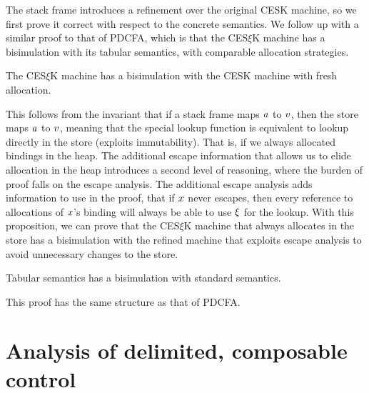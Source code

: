 The stack frame introduces a refinement over the original CESK machine, so we first prove it correct with respect to the concrete semantics.
%
We follow up with a similar proof to that of PDCFA, which is that the CES$\xi$K machine has a bisimulation with its tabular semantics, with comparable allocation strategies.
\begin{theorem}\label{thm:refinement}
  The CES$\xi$K machine has a bisimulation with the CESK machine with fresh allocation.
\end{theorem}
This follows from the invariant that if a stack frame maps $a$ to $v$, then the store maps $a$ to $v$, meaning that the special lookup function is equivalent to lookup directly in the store (exploits immutability).
%
That is, if we always allocated bindings in the heap.
%
The additional escape information that allows us to elide allocation in the heap introduces a second level of reasoning, where the burden of proof falls on the escape analysis.
%
The additional escape analysis adds information to use in the proof, that if $x$ never escapes, then every reference to allocations of $x$'s binding will always be able to use $\xi$ for the lookup.
%
With this proposition, we can prove that the CES$\xi$K machine that always allocates in the store has a bisimulation with the refined machine that exploits escape analysis to avoid unnecessary changes to the store.
%

\begin{theorem}\label{thm:cfa2}
  Tabular semantics has a bisimulation with standard semantics.
\end{theorem}
This proof has the same structure as that of PDCFA.

\section{Analysis of delimited, composable control}
\label{sec:sr}


